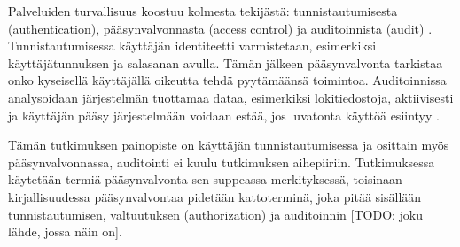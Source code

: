 Palveluiden turvallisuus koostuu kolmesta tekijästä: tunnistautumisesta (authentication), pääsynvalvonnasta (access control) ja auditoinnista (audit) \cite{sandhu}. Tunnistautumisessa käyttäjän identiteetti varmistetaan, esimerkiksi käyttäjätunnuksen ja salasanan avulla. Tämän jälkeen pääsynvalvonta tarkistaa onko kyseisellä käyttäjällä oikeutta tehdä pyytämäänsä toimintoa. Auditoinnissa analysoidaan järjestelmän tuottamaa dataa, esimerkiksi lokitiedostoja, aktiivisesti ja käyttäjän pääsy järjestelmään voidaan estää, jos luvatonta käyttöä esiintyy \cite{sandhu}.

Tämän tutkimuksen painopiste on käyttäjän tunnistautumisessa ja osittain myös pääsynvalvonnassa, auditointi ei kuulu tutkimuksen aihepiiriin. Tutkimuksessa käytetään termiä pääsynvalvonta sen suppeassa merkityksessä, toisinaan kirjallisuudessa pääsynvalvontaa pidetään kattoterminä, joka pitää sisällään tunnistautumisen, valtuutuksen (authorization) ja auditoinnin [TODO: joku lähde, jossa näin on].